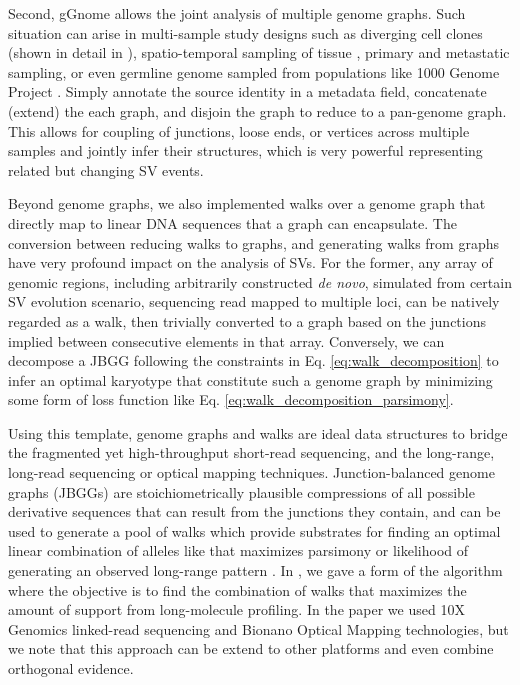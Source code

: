 \documentclass[phd,tocprelim]{cornell}
\begin{document}
Second, gGnome allows the joint analysis of multiple genome graphs. Such situation can arise in multi-sample study designs such as diverging cell clones (shown in detail in ), spatio-temporal sampling of tissue \cite{Paulson2021-nd}, primary and metastatic sampling, or even germline genome sampled from populations like 1000 Genome Project \cite{Khurana2013-qc}. Simply annotate the source identity in a metadata field, concatenate (extend) the each graph, and disjoin the graph to reduce to a pan-genome graph. This allows for coupling of junctions, loose ends, or vertices across multiple samples and jointly infer their structures, which is very powerful representing related but changing SV events.

Beyond genome graphs, we also implemented walks over a genome graph that directly map to linear DNA sequences that a graph can encapsulate. The conversion between reducing walks to graphs, and generating walks from graphs have very profound impact on the analysis of SVs. For the former, any array of genomic regions, including arbitrarily constructed \textit{de novo}, simulated from certain SV evolution scenario, sequencing read mapped to multiple loci, can be natively regarded as a walk, then trivially converted to a graph based on the junctions implied between consecutive elements in that array. Conversely, we can decompose a JBGG following the constraints in Eq. \ref{eq:walk_decomposition} to infer an optimal karyotype that constitute such a genome graph by minimizing some form of loss function like Eq. \ref{eq:walk_decomposition_parsimony}.

Using this template, genome graphs and walks are ideal data structures to bridge the fragmented yet high-throughput short-read sequencing, and the long-range, long-read sequencing or optical mapping techniques. Junction-balanced genome graphs (JBGGs) are stoichiometrically plausible compressions of all possible derivative sequences that can result from the junctions they contain, and can be used to generate a pool of walks which provide substrates for finding an optimal linear combination of alleles like that maximizes parsimony or likelihood of generating an observed long-range pattern \cite{Hadi2020-um}. In \cite{Hadi2020-um}, we gave a form of the algorithm  where the objective is to find the combination of walks that maximizes the amount of support from long-molecule profiling. In the paper we used 10X Genomics linked-read sequencing and Bionano Optical Mapping technologies, but we note that this approach can be extend to other platforms and even combine orthogonal evidence.
\end{document}
